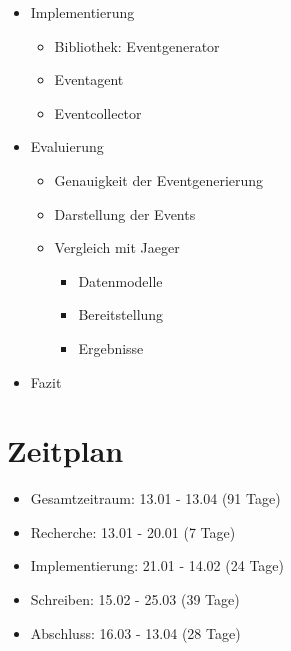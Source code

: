 \documentclass[a4paper]{article}
\begin{document}
\begin{itemize}
\begin{itemize}
	\end{itemize}
	\item Implementierung
	\begin{itemize}
		\item Bibliothek: Eventgenerator
		\item Eventagent
		\item Eventcollector
	\end{itemize}
	\item Evaluierung
	\begin{itemize}
		\item Genauigkeit der Eventgenerierung
		\item Darstellung der Events
		\item Vergleich mit Jaeger
		\begin{itemize}
			\item Datenmodelle
			\item Bereitstellung
			\item Ergebnisse
		\end{itemize}
	\end{itemize}
	\item Fazit
\end{itemize}

\section{Zeitplan}
\begin{itemize}
	
\item		Gesamtzeitraum: 13.01 - 13.04 (91 Tage)

\item		Recherche: 13.01 - 20.01 (7 Tage)
\item		Implementierung: 21.01 - 14.02 (24 Tage)
\item		Schreiben:  15.02 - 25.03 (39 Tage)
\item		Abschluss: 16.03 - 13.04 (28 Tage)

\end{itemize}
\newpage
\printbibliography[title=Literaturverzeichnis]
\end{document}
